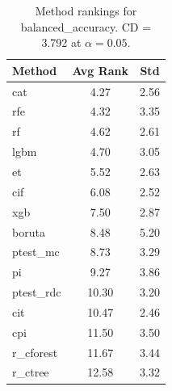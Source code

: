 \begin{table}[h]
\centering
\caption{Method rankings for balanced_accuracy. CD = 3.792 at $\alpha=0.05$.}
\label{tab:ranks_balanced_accuracy}
\begin{tabular}{lcc}
\toprule
Method & Avg Rank & Std \\
\midrule
cat & 4.27 & 2.56 \\
rfe & 4.32 & 3.35 \\
rf & 4.62 & 2.61 \\
lgbm & 4.70 & 3.05 \\
et & 5.52 & 2.63 \\
cif & 6.08 & 2.52 \\
xgb & 7.50 & 2.87 \\
boruta & 8.48 & 5.20 \\
ptest_mc & 8.73 & 3.29 \\
pi & 9.27 & 3.86 \\
ptest_rdc & 10.30 & 3.20 \\
cit & 10.47 & 2.46 \\
cpi & 11.50 & 3.50 \\
r_cforest & 11.67 & 3.44 \\
r_ctree & 12.58 & 3.32 \\
\bottomrule
\end{tabular}
\end{table}